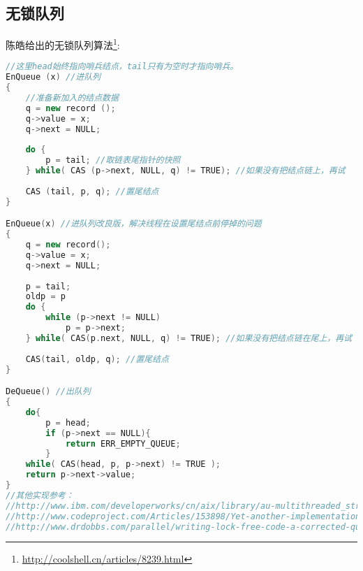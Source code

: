 \subsection{无锁队列}
陈皓给出的无锁队列算法\footnote{\url{http://coolshell.cn/articles/8239.html}}:
\begin{lstlisting}[language=C++]
//这里head始终指向哨兵结点，tail只有为空时才指向哨兵。
EnQueue (x) //进队列
{
    //准备新加入的结点数据
    q = new record ();
    q->value = x;
    q->next = NULL;
 
    do {
        p = tail; //取链表尾指针的快照
    } while( CAS (p->next, NULL, q) != TRUE); //如果没有把结点链上，再试
 
    CAS (tail, p, q); //置尾结点
}

EnQueue(x) //进队列改良版，解决线程在设置尾结点前停掉的问题
{
    q = new record();
    q->value = x;
    q->next = NULL;
 
    p = tail;
    oldp = p
    do {
        while (p->next != NULL)
            p = p->next;
    } while( CAS(p.next, NULL, q) != TRUE); //如果没有把结点链在尾上，再试
 
    CAS(tail, oldp, q); //置尾结点
}

DeQueue() //出队列
{
    do{
        p = head;
        if (p->next == NULL){
            return ERR_EMPTY_QUEUE;
        }
    while( CAS(head, p, p->next) != TRUE );
    return p->next->value;
}
//其他实现参考：
//http://www.ibm.com/developerworks/cn/aix/library/au-multithreaded_structures2/index.html
//http://www.codeproject.com/Articles/153898/Yet-another-implementation-of-a-lock-free-circular
//http://www.drdobbs.com/parallel/writing-lock-free-code-a-corrected-queue/210604448?pgno=2
\end{lstlisting}







